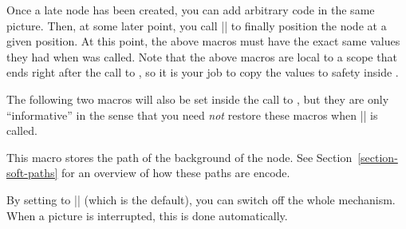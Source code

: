 \begin{command}{\pgfpositionnodelater{}}
    Once a late node has been created, you can add arbitrary code in the same
    picture. Then, at some later point, you call |\pgfpositionnodenow| to
    finally position the node at a given position.  At this point, the above
    macros must have the exact same values they had when  was
    called. Note that the above macros are local to a scope that ends right
    after the call to , so it is your job to copy the values
    to safety inside .

    The following two macros will also be set inside the call to , but they are only ``informative'' in the sense that you need
    \emph{not} restore these macros when |\pgfpositionnodenow| is called.

    \begin{command}{\pgfpositionnodelaterpath}
        This macro stores the path of the background of the node. See
        Section~\ref{section-soft-paths} for an overview of how these paths are
        encode.
    \end{command}

    By setting  to |\relax| (which is the default), you can
    switch off the whole mechanism. When a picture is interrupted, this is done
    automatically.
\end{command}

